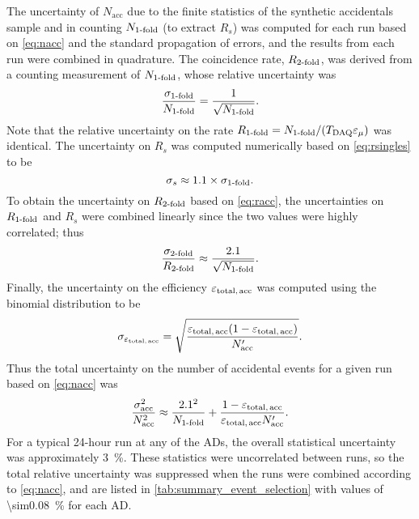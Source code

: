 The uncertainty of $N_{\text{acc}}$ due to the finite statistics
of the synthetic accidentals sample
and in counting $N_{\text{\ensuremath{1}-fold}}$ (to extract $R_s$)
was computed for each run based on \cref{eq:nacc}
and the standard propagation of errors,
and the results from each run were combined in quadrature.
The  coincidence rate, $R_\text{\ensuremath{2}-fold}$,
was derived from a counting measurement of $N_\text{\ensuremath{1}-fold}$,
whose relative uncertainty was
\begin{equation}\label{eq:sigma_1fold}
    \frac{\sigma_\text{\ensuremath{1}-fold}}{N_\text{\ensuremath{1}-fold}} =
    \frac{1}{\sqrt{N_\text{\ensuremath{1}-fold}}}.
\end{equation}
Note that the relative uncertainty on the rate
$R_\text{\ensuremath{1}-fold} = N_\text{\ensuremath{1}-fold}/(T_\text{DAQ}\varepsilon_\mu)$ was identical.
The uncertainty on $R_s$ was computed numerically
based on \cref{eq:rsingles} to be
\begin{equation}\label{eq:sigma_rs}
    \sigma_s \approx 1.1\times\sigma_\text{\ensuremath{1}-fold}.
\end{equation}
To obtain the uncertainty on $R_\text{\ensuremath{2}-fold}$ based on \cref{eq:racc},
the uncertainties on $R_\text{\ensuremath{1}-fold}$ and $R_s$ were combined linearly
since the two values were highly correlated; thus
\begin{equation}\label{eq:sigma_2fold}
    \frac{\sigma_\text{\ensuremath{2}-fold}}{R_\text{\ensuremath{2}-fold}} \approx
    \frac{2.1}{\sqrt{N_\text{\ensuremath{1}-fold}}}.
\end{equation}
Finally, the uncertainty on the efficiency $\varepsilon_\text{total,\,acc}$
was computed using the binomial distribution to be
\begin{equation}\label{eq:sigma_eps_acc}
    \sigma_{\varepsilon_\text{total,\,acc}} =
    \sqrt{
        \frac{
            \varepsilon_\text{total,\,acc} (1 - \varepsilon_\text{total,\,acc})
        }{N_\text{acc}'}
    }.
\end{equation}
Thus the total uncertainty on the number of accidental events
for a given run based on \cref{eq:nacc} was
\begin{equation}\label{eq:sigma_acc}
    \frac{\sigma_\text{acc}^2}{N_\text{acc}^2} \approx
    \frac{2.1^2}{N_\text{\ensuremath{1}-fold}}
    + \frac{1-\varepsilon_\text{total,\,acc}}{
        \varepsilon_\text{total,\,acc} N_\text{acc}'
    }.
\end{equation}
For a typical 24-hour run at any of the ADs,
the overall statistical uncertainty was approximately \SI{3}{\percent}.
These statistics were uncorrelated between runs,
so the total relative uncertainty was suppressed
when the runs were combined according to \cref{eq:nacc},
and are listed in \cref{tab:summary_event_selection}
with values of \SI{\sim0.08}{\percent} for each AD.

